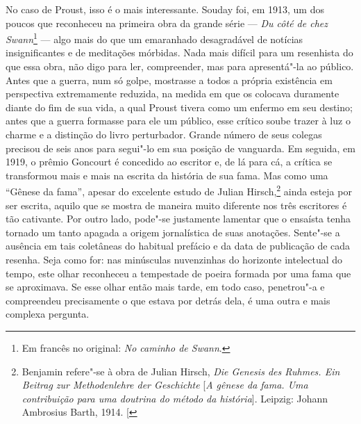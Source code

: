 No caso de Proust, isso é o mais interessante. Souday foi, em 1913, um
dos poucos que reconheceu na primeira obra da grande série --- \emph{Du côté de chez Swann}\footnote{Em francês no original: \emph{No
caminho de Swann}.} --- algo mais do que um emaranhado desagradável de
notícias insignificantes e de meditações mórbidas. Nada mais difícil
para um resenhista do que essa obra, não digo para ler, compreender, mas
para apresentá"-la ao público. Antes que a guerra, num só golpe,
mostrasse a todos a própria existência em perspectiva extremamente
reduzida, na medida em que os colocava duramente diante do fim de sua
vida, a qual Proust tivera como um enfermo em seu destino; antes que a
guerra formasse para ele um público, esse crítico soube trazer à luz o
charme e a distinção do livro perturbador. Grande número de seus colegas
precisou de seis anos para segui"-lo em sua posição de vanguarda. Em
seguida, em 1919, o prêmio Goncourt é concedido ao escritor e, de lá
para cá, a crítica se transformou mais e mais na escrita da história de
sua fama. Mas como uma ``Gênese da fama'', apesar do excelente estudo de
Julian Hirsch,\footnote{Benjamin refere"-se à obra de Julian Hirsch,
  \emph{Die Genesis des Ruhmes. Ein Beitrag zur Methodenlehre der
  Geschichte} {[}\emph{A gênese da fama. Uma contribuição para uma
  doutrina do método da história}{]}. Leipzig: Johann Ambrosius Barth,
  1914. {[}\versal{N. E.}{]}} ainda esteja por ser escrita, aquilo que se mostra
de maneira muito diferente nos três escritores é tão cativante. Por
outro lado, pode"-se justamente lamentar que o ensaísta tenha tornado um
tanto apagada a origem jornalística de suas anotações. Sente"-se a
ausência em tais coletâneas do habitual prefácio e da data de publicação
de cada resenha. Seja como for: nas minúsculas nuvenzinhas do horizonte
intelectual do tempo, este olhar reconheceu a tempestade de poeira
formada por uma fama que se aproximava. Se esse olhar então mais tarde,
em todo caso, penetrou"-a e compreendeu precisamente o que estava por
detrás dela, é uma outra e mais complexa pergunta.

